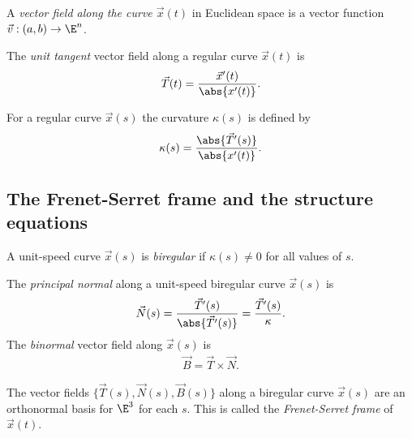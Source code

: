 \documentclass{article}
\begin{document}
\begin{definition}
    A \emph{vector field along the curve $\vec x(t)$} in Euclidean space is a vector
    function $\vec v:(a,b)\to\E^n$.
\end{definition}

\begin{definition}
    The \emph{unit tangent} vector field along a regular curve $\vec x(t)$ is 
    \begin{align*}
        \vec T(t) = \frac{\vec x'(t)}{\abs{x'(t)}}.
    \end{align*}
\end{definition}

\begin{definition}
    For a regular curve $\vec x(s)$ the curvature $\kappa(s)$ is defined by
    \begin{align*}
        \kappa(s) = \frac{\abs{\vec T'(s)}}{\abs{x'(t)}}.
    \end{align*}
\end{definition}

\subsection{The Frenet-Serret frame and the structure equations}

\begin{definition}
    A unit-speed curve $\vec x(s)$ is \emph{biregular} if $\kappa(s)\not=0$ for
    all values of $s$.
\end{definition}

\begin{definition}
    The \emph{principal normal} along a unit-speed biregular curve $\vec x(s)$ is
    \begin{align*}
        \vec N(s) = \frac{\vec T'(s)}{\abs{\vec T'(s)}}=\frac{\vec T'(s)}{\kappa}.
    \end{align*}
    The \emph{binormal} vector field along $\vec x(s)$ is
    \begin{align*}
        \vec B = \vec T \times \vec N.
    \end{align*}
\end{definition}

\begin{proposition}[Notes 3.14]
    The vector fields $\{\vec T(s), \vec N(s), \vec B(s)\}$ along a biregular curve
    $\vec x(s)$ are an orthonormal basis for $\E^3$ for each $s$. This is called the
    \emph{Frenet-Serret frame} of $\vec x(t)$.
\end{proposition}
\end{document}
